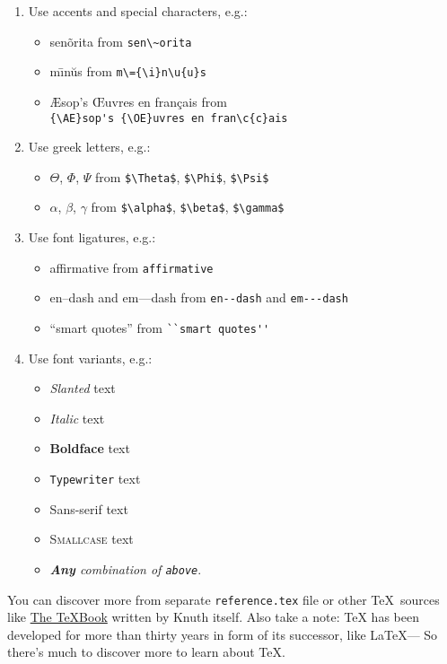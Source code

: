 \documentclass[12pt]{article}
\begin{document}
	\begin{enumerate}
		\item Use accents and special characters, e.g.:
		\begin{itemize}
			\item sen\~orita from \verb|sen\~orita|
			\item m\={\i}n\u{u}s from \verb|m\={\i}n\u{u}s|
			\item {\AE}sop's {\OE}uvres en fran\c{c}ais from\\ \verb|{\AE}sop's {\OE}uvres en fran\c{c}ais|
		\end{itemize}
		\item Use greek letters, e.g.:			
		\begin{itemize}
			\item $\Theta$, $\Phi$, $\Psi$ from \verb|$\Theta$|, \verb|$\Phi$|, \verb|$\Psi$|
			\item $\alpha$, $\beta$, $\gamma$ from \verb|$\alpha$|, \verb|$\beta$|, \verb|$\gamma$|
		\end{itemize}
		\item Use font ligatures, e.g.:
		\begin{itemize}
			\item affirmative from \verb|affirmative|
			\item en--dash and em---dash from \verb|en--dash| and \verb|em---dash|
			\item ``smart quotes'' from \verb|``smart quotes''|
		\end{itemize}
	    \item Use font variants, e.g.:
	    \begin{itemize}
	    	\item \textsl{Slanted} text
	    	\item \textit{Italic} text
	    	\item \textbf{Boldface} text
	    	\item \texttt{Typewriter} text
	    	\item \textsf{Sans-serif} text
	    	\item \textsc{Smallcase} text
	    	\item \textit{\textbf{Any} \textsf{combination} of \texttt{above}}.
    	\end{itemize}
	    
	\end{enumerate}
	 
	 You can discover more from separate \verb|reference.tex| file or other \TeX\ sources like \href{http://www.ctex.org/documents/shredder/src/texbook.pdf}{The TeXBook} written by Knuth itself. Also take a note: TeX has been developed for more than thirty years in form of its successor, like \LaTeX --- So there's much to discover more to learn about TeX. 
	 
\end{document}
